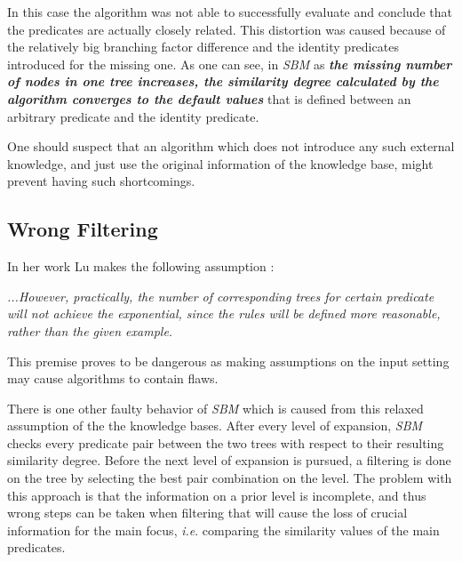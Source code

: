 In this case the algorithm was not able to successfully evaluate and conclude that the predicates are actually closely related. This distortion was caused because of the relatively big branching factor difference and the identity predicates introduced for the missing one. As one can see, in \textit{SBM} as \textit{\textbf{the missing number of nodes in one tree increases,  the similarity degree calculated by the algorithm converges to the default values}} that is defined between an arbitrary predicate and the identity predicate.

One should suspect that an  algorithm which does not introduce any such external knowledge, and just use the original information of the knowledge base, might prevent having such shortcomings.













\subsection{Wrong Filtering}
\label{filt}

In her work Lu makes the following assumption \cite{Lu}:

\textit{...However, practically, the number of corresponding trees for certain predicate will not achieve the exponential, since the rules will be defined more reasonable, rather than the given example.} 


This premise proves to be dangerous as making assumptions on the input setting may cause algorithms to contain flaws.

There is one other faulty behavior of \textit{SBM} which is caused from this relaxed assumption of the the knowledge bases. After every level of expansion, \textit{SBM} checks every predicate pair between the two trees with respect to their resulting similarity degree. Before the next level of expansion is pursued, a filtering is done on the tree by selecting the best pair combination on the level. The problem with this approach is that the information on a prior level is incomplete, and thus wrong steps can be taken when filtering that will cause the loss of crucial information for the main focus, \textit{i.e}. comparing the similarity values of the main predicates.  

